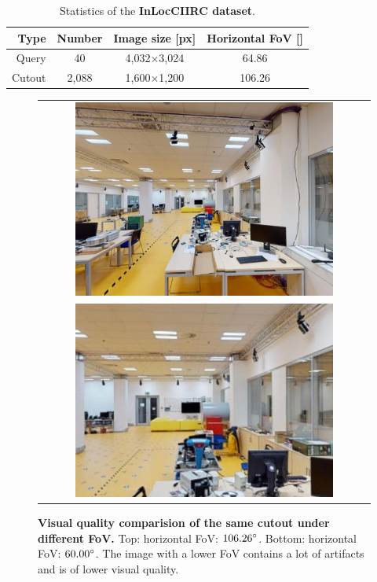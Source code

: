 \documentclass[twoside]{ctuthesis}
\theoremstyle{plain}
\theoremstyle{definition}
\theoremstyle{note}
\begin{document}
\begin{table}[t]
    \centering
    {\footnotesize
	\begin{tabular}{|r||c|c|c|}
	\hline
	Type & Number & Image size [px] & Horizontal FoV [\degree] \\[1pt]
	\hline
    Query & 40 & 4,032$\times$3,024 & 64.86 \\[1pt]
	Cutout & 2,088 & 1,600$\times$1,200 & 106.26 \\[3pt]
	\hline
    \end{tabular}
	\caption{Statistics of the {\bf InLocCIIRC dataset}.}
	\label{tab:dataset-statistics}
    }
\end{table}

\begin{figure}
    \centering
    {
    \begin{tabular}{c}
    \includegraphics[width=0.8\textwidth]{cutout_19_-90_0_FoV106} \\
    \includegraphics[width=0.8\textwidth]{cutout_19_-90_0_FoV60}
    \end{tabular}
	\caption{{\bf Visual quality comparision of the same cutout under different FoV.} Top: horizontal FoV: $106.26\degree$. Bottom: horizontal FoV: $60.00\degree$. The image with a lower FoV contains a lot of artifacts and is of lower visual quality.}
	\label{fig:fov-quality}
    }
\end{figure}
\end{document}
